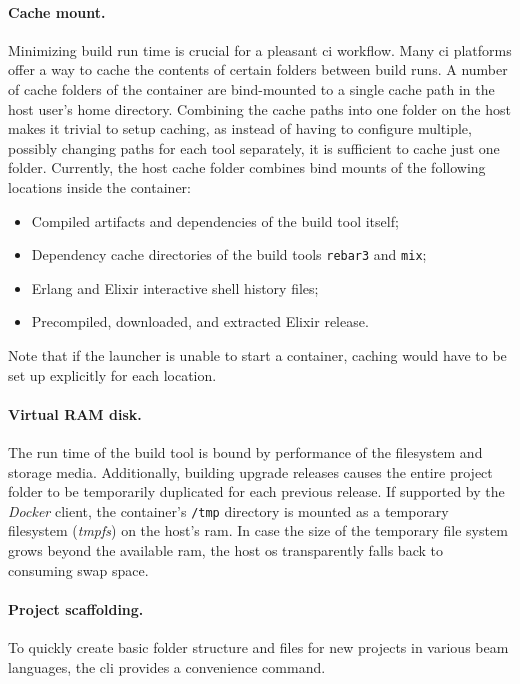 \paragraph{Cache mount.} Minimizing build run time is crucial for a pleasant \acrlong{ci} workflow. Many \acrshort{ci} platforms offer a way to cache the contents of certain folders between build runs. A number of cache folders of the container are bind-mounted to a single cache path in the host user's home directory. Combining the cache paths into one folder on the host makes it trivial to setup caching, as instead of having to configure multiple, possibly changing paths for each tool separately, it is sufficient to cache just one folder. Currently, the host cache folder combines bind mounts of the following locations inside the container:
\begin{itemize}
  \item Compiled artifacts and dependencies of the build tool itself;
  \item Dependency cache directories of the build tools \lstinline|rebar3| and \lstinline|mix|;
  \item Erlang and Elixir interactive shell history files;
  \item Precompiled, downloaded, and extracted Elixir release.
\end{itemize}
Note that if the launcher is unable to start a container, caching would have to be set up explicitly for each location.

\paragraph{Virtual RAM disk.} The run time of the build tool is bound by performance of the filesystem and storage media. Additionally, building upgrade releases causes the entire project folder to be temporarily duplicated for each previous release.
If supported by the \emph{Docker} client, the container's \lstinline|/tmp| directory is mounted as a temporary filesystem (\emph{tmpfs}) on the host's \acrshort{ram}. In case the size of the temporary file system grows beyond the available \acrshort{ram}, the host \acrshort{os} transparently falls back to consuming swap space.

\paragraph{Project scaffolding.} To quickly create basic folder structure and files for new projects in various \acrshort{beam} languages, the \acrshort{cli} provides a convenience command.

